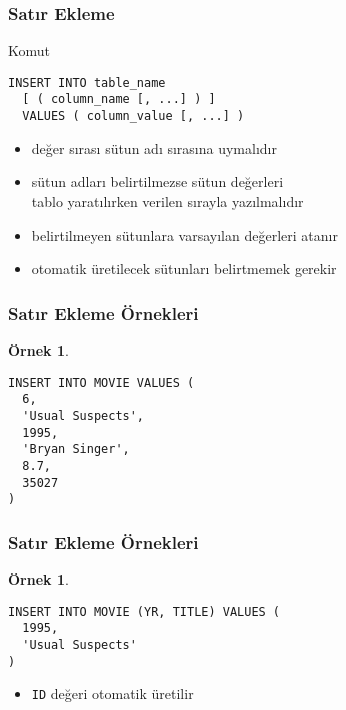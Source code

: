 \documentclass[dvipsnames]{beamer}
\theoremstyle{definition}
\theoremstyle{example}
\newtheorem{ornek}[theorem]{Örnek}
\theoremstyle{plain}
\begin{document}
\begin{frame}[fragile]
  \frametitle{Satır Ekleme}

  \begin{block}{Komut}
    \begin{lstlisting}
INSERT INTO table_name
  [ ( column_name [, ...] ) ]
  VALUES ( column_value [, ...] )
    \end{lstlisting}
  \end{block}

  \pause
  \begin{itemize}
    \item değer sırası sütun adı sırasına uymalıdır
    \item sütun adları belirtilmezse sütun değerleri\\
      tablo yaratılırken verilen sırayla yazılmalıdır
    \item belirtilmeyen sütunlara varsayılan değerleri atanır

    \pause
    \medskip
    \item otomatik üretilecek sütunları belirtmemek gerekir
  \end{itemize}
\end{frame}

\begin{frame}[fragile]
  \frametitle{Satır Ekleme Örnekleri}

  \begin{ornek}
    \begin{lstlisting}
INSERT INTO MOVIE VALUES (
  6,
  'Usual Suspects',
  1995,
  'Bryan Singer',
  8.7,
  35027
)
    \end{lstlisting}
  \end{ornek}
\end{frame}

\begin{frame}[fragile]
  \frametitle{Satır Ekleme Örnekleri}

  \begin{ornek}
    \begin{lstlisting}
INSERT INTO MOVIE (YR, TITLE) VALUES (
  1995,
  'Usual Suspects'
)
    \end{lstlisting}

    \pause
    \begin{itemize}
      \item \texttt{ID} değeri otomatik üretilir
    \end{itemize}
  \end{ornek}
\end{frame}
\end{document}
